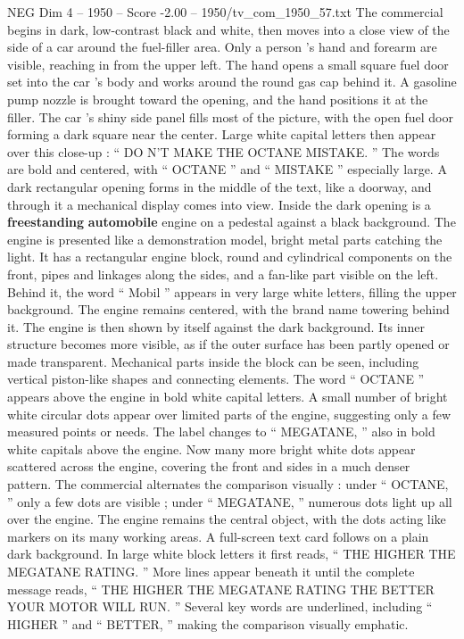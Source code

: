 \begin{textsample}{NEG Dim 4 – 1950 – Score -2.00 – 1950/tv\_com\_1950\_57.txt}  \label{ex:f4_neg_062}
The commercial begins in dark, low-contrast black and white, then moves into a close view of the side of a car around the fuel-filler area.
Only a person ’s hand and forearm are visible, reaching in from the upper left.
The hand opens a small square fuel door set into the car ’s body and works around the round gas cap behind it.
A gasoline pump nozzle is brought toward the opening, and the hand positions it at the filler.
The car ’s shiny side panel fills most of the picture, with the open fuel door forming a dark square near the center.
Large white capital letters then appear over this close-up : “ DO N’T MAKE THE OCTANE MISTAKE. ” The words are bold and centered, with “ OCTANE ” and “ MISTAKE ” especially large.
A dark rectangular opening forms in the middle of the text, like a doorway, and through it a mechanical display comes into view.
Inside the dark opening is a \textbf{freestanding} \textbf{automobile} engine on a pedestal against a black background.
The engine is presented like a demonstration model, bright metal parts catching the light.
It has a rectangular engine block, round and cylindrical components on the front, pipes and linkages along the sides, and a fan-like part visible on the left.
Behind it, the word “ Mobil ” appears in very large white letters, filling the upper background.
The engine remains centered, with the brand name towering behind it.
The engine is then shown by itself against the dark background.
Its inner structure becomes more visible, as if the outer surface has been partly opened or made transparent.
Mechanical parts inside the block can be seen, including vertical piston-like shapes and connecting elements.
The word “ OCTANE ” appears above the engine in bold white capital letters.
A small number of bright white circular dots appear over limited parts of the engine, suggesting only a few measured points or needs.
The label changes to “ MEGATANE, ” also in bold white capitals above the engine.
Now many more bright white dots appear scattered across the engine, covering the front and sides in a much denser pattern.
The commercial alternates the comparison visually : under “ OCTANE, ” only a few dots are visible ; under “ MEGATANE, ” numerous dots light up all over the engine.
The engine remains the central object, with the dots acting like markers on its many working areas.
A full-screen text card follows on a plain dark background.
In large white block letters it first reads, “ THE HIGHER THE MEGATANE RATING. ” More lines appear beneath it until the complete message reads, “ THE HIGHER THE MEGATANE RATING THE BETTER YOUR MOTOR WILL RUN. ” Several key words are underlined, including “ HIGHER ” and “ BETTER, ” making the comparison visually emphatic.

\end{textsample}
